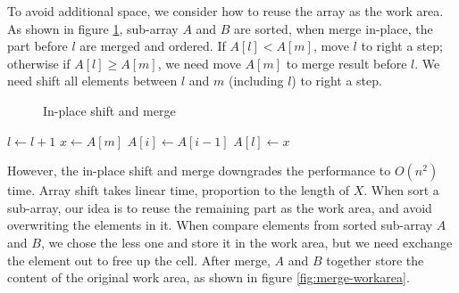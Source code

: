 \documentclass[b5paper]{article}
\begin{document}
To avoid additional space, we consider how to reuse the array as the work area. As shown in figure \cref{fig:merge-in-place-naive}, sub-array $A$ and $B$ are sorted, when merge in-place, the part before $l$ are merged and ordered. If $A[l] < A[m]$, move $l$ to right a step; otherwise if $A[l] \geq A[m]$, we need move $A[m]$ to merge result before $l$. We need shift all elements between $l$ and $m$ (including $l$) to right a step.

\begin{figure}[htbp]
 \centering
 \caption{In-place shift and merge}
 \label{fig:merge-in-place-naive}
\end{figure}

\begin{algorithmic}[1]
      \State $l \gets l + 1$
    \Else
      \State $x \gets A[m]$
       
        \State $A[i] \gets A[i-1]$
      \EndFor
      \State $A[l] \gets x$
    \EndIf
  \EndWhile
\EndProcedure
\end{algorithmic}

However, the in-place shift and merge downgrades the performance to $O(n^2)$ time. Array shift takes linear time, proportion to the length of $X$. When sort a sub-array, our idea is to reuse the remaining part as the work area, and avoid overwriting the elements in it. When compare elements from sorted sub-array $A$ and $B$, we chose the less one and store it in the work area, but we need exchange the element out to free up the cell. After merge, $A$ and $B$ together store the content of the original work area, as shown in figure \cref{fig:merge-workarea}.
\end{document}
